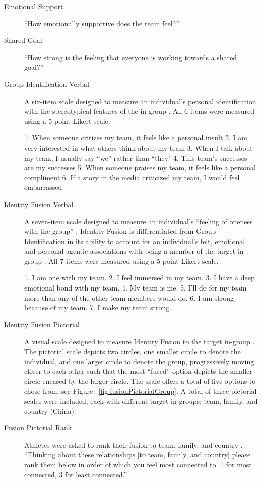 
  \begin{description}
    \item [Emotional Support] ``How emotionally supportive does the team feel?''
    \item [Shared Goal] ``How strong is the feeling that everyone is working towards a shared goal?''

    \item [Group Identification Verbal] A six-item scale designed to measure an individual's personal identification with the stereotypical features of the in-group  \citep{Mael1992}.  All 6 items were measured using a 5-point Likert scale.

  1. When someone critizes my team, it feels like a personal insult
  2. I am very interested in what others think about my team
  3. When I talk about my team, I usually say “we” rather than “they"
  4. This team's successes are my successes
  5. When someone praises my team, it feels like a personal compliment
  6. If a story in the media criticized my team, I would feel embarrassed

  \item [Identity Fusion Verbal] A seven-item scale designed to measure an individual's ``feeling of oneness with the group'' \citep{Swann2009}.  Identity Fusion is differentiated from Group Identification in its ability to account for an individual's felt, emotional and personal agentic associations with being a member of the target in-group \citep{Swann2012a}.  All 7 items were measured using a 5-point Likert scale.

  1. I am one with my team.
  2. I feel immersed in my team.
  3. I have a deep emotional bond with my team.
  4. My team is me.
  5. I’ll do for my team more than any of the other team members would do.
  6. I am strong because of my team.
  7. I make my team strong.

  \item [Identity Fusion Pictorial] A visual scale designed to measure Identity Fusion to the target in-group \citep{Swann2009}. The pictorial scale depicts two circles, one smaller circle to denote the individual, and one larger circle to denote the group, progressively moving closer to each other such that the most ``fused'' option depicts the smaller circle encased by the larger circle. The scale offers a total of five options to chose from, see Figure ~\ref{fig:fusionPictorialGroup}.  A total of three pictorial scales were included, each with different target in-groups: team, family, and country (China).

  \item [Fusion Pictorial Rank] Athletes were asked to rank their fusion to team, family, and country \citep{Whitehouse2014}.  ``Thinking about these relationships [to team, family, and country] please rank them below in order of which you feel most connected to. 1 for most connected, 3 for least connected.''
  \end{description}


